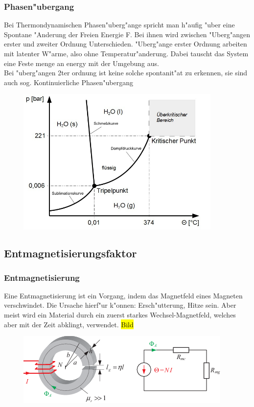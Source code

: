         \subsubsection*{Phasen"ubergang}
            Bei Thermondynamischen Phasen"uberg"ange spricht man h"aufig "uber eine Spontane "Anderung der Freien Energie F.
            Bei ihnen wird zwischen "Uberg"angen erster und zweiter Ordnung Unterschieden. "Uberg"ange erster Ordnung
            arbeiten mit latenter W"arme, also ohne Temperatur"anderung. Dabei tauscht das System eine Feste menge an energy
            mit der Umgebung aus.\\
            Bei "uberg"angen 2ter ordnung ist keine solche spontanit"at zu erkennen, sie sind auch sog. Kontinuierliche Phasen"ubergang
            \begin{figure}[H]
                \centering
                \includegraphics[width=0.9\textwidth]{Images/waterphase.jpg}
            \end{figure}
    \subsection{Entmagnetisierungsfaktor}

        \subsubsection*{Entmagnetisierung}
            Eine Entmagnetisierung ist ein Vorgang, indem das Magnetfeld eines Magneten verschwindet.
            Die Ursache hierf"ur k"onnen: Ersch"utterung, Hitze sein. Aber meist wird ein Material
            durch ein zuerst starkes Wechsel-Magnetfeld, welches aber mit der Zeit abklingt, verwendet.
            \hl{Bild}
            \begin{figure}[H]
                \centering
                \includegraphics{images/Ringkern}
            \end{figure}
